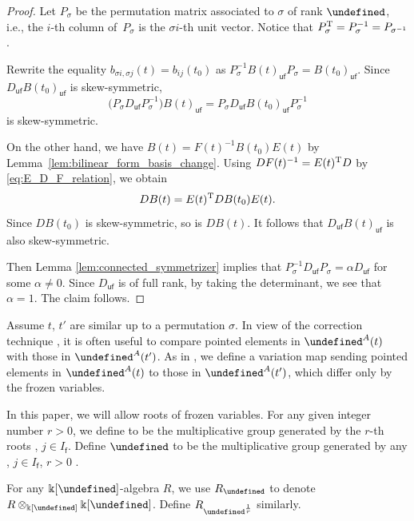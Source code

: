 \documentclass[10pt,a4paper]{amsart}
\newcommand{\kk}{\Bbbk}
\newcommand{\Q}{\mathbb{Q}}
\newcommand{\opname}[1]{\operatorname{\mathsf{#1}}}
\newcommand{\fv}{\opname{f}}
\newcommand{\ufv}{\opname{uf}}
\let\Iufv\undefined
\let\LP\undefined
\let\fFac\undefined
\let\fFacRoot\undefined
\newcommand{\Iufv}{I_{\ufv}}
\newcommand{\LP}{{\mathcal{LP}}}
\newcommand{\fFac}{\mathcal{Z}}
\newcommand{\fFacRoot}{\fFac^{\Q}}
\numberwithin{equation}{section}
\begin{document}
\begin{proof}
Let $P_{\sigma}$ be the permutation matrix associated to $\sigma$ of rank $\Iufv$, i.e., the $i$-th column of~$P_{\sigma}$ is the $\sigma i$-th unit vector. Notice that $P_{\sigma}^{\rm T}=P_{\sigma}^{-1}=P_{\sigma^{-1}}$.

Rewrite the equality $b_{\sigma i,\sigma j}(t)=b_{ij}(t_{0})$ as $P_{\sigma}^{-1}B(t)_{\ufv}P_{\sigma}=B(t_0)_{\ufv}$.
Since $D_{\ufv}B(t_0)_{\ufv}$ is skew-symmetric,
\[\big(P_{\sigma}D_{\ufv}P_{\sigma}^{-1}\big)B(t)_{\ufv}=P_{\sigma}D_{\ufv}B(t_0)_{\ufv}P_{\sigma}^{-1}\]
is skew-symmetric.

On the other hand, we have $B(t)=F(t)^{-1}B(t_{0})E(t)$ by Lemma~\ref{lem:bilinear_form_basis_change}. Using $DF(t)^{-1}=E(t)^{\rm T}D$
by \eqref{eq:E_D_F_relation}, we obtain
\[DB(t)=E(t)^{\rm T}DB(t_{0})E(t).\]
Since $DB(t_{0})$ is skew-symmetric, so is $DB(t)$. It follows that
$D_{\ufv}B(t)_{\ufv}$ is also skew-symmetric.

Then Lemma \ref{lem:connected_symmetrizer} implies that $P_{\sigma}^{-1}D_{\ufv}P_{\sigma}=\alpha D_{\ufv}$
for some $\alpha\neq0$. Since $D_{\ufv}$ is of full rank,
by taking the determinant, we see that $\alpha=1$. The claim follows.
\end{proof}

Assume $t$, $t'$ are similar up to a permutation $\sigma$. In view
of the correction technique \cite{Qin12}, it is often useful to compare
pointed elements in $\LP^A(t)$ with those in $\LP^A(t')$. As in \cite{qin2017triangular},
we define a variation map sending pointed elements in $\LP^A(t)$ to
those in $\LP^A(t')$, which differ only by the frozen variables.

In this paper, we will allow roots of frozen variables. For any given
integer number $r>0$, we define \smash{$\fFac^{\frac{1}{r}}$} to be the
multiplicative group generated by the $r$-th roots ,
$j\in I_{\fv}$. Define $\fFacRoot$ to be the multiplicative group
generated by any , $j\in I_{\fv}$, $r>0$
.

For any $\kk[\fFac]$-algebra $R$, we use $R_{\fFacRoot}$ to denote
$R\otimes_{\kk[\fFac]}\kk[\fFacRoot]$. Define $R_{\fFac^{\frac{1}{r}}}$
similarly.
\end{document}
